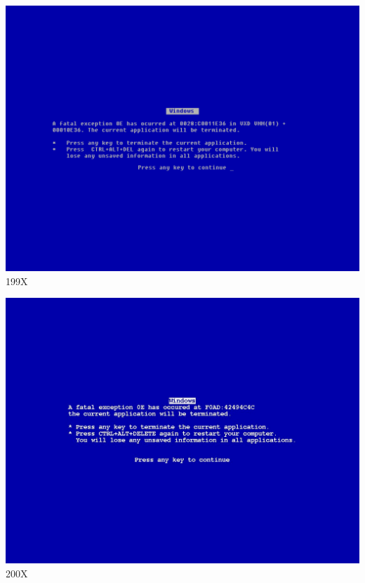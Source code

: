 \documentclass{beamer}
\begin{document}
\begin{frame}
  \begin{center}
    \includegraphics[scale=0.26]{images/Windows_9x_Blue_Screen_of_Death_recreated_in_Fixedsys.png}\\
    199X
  \end{center}
\end{frame}

\begin{frame}
  \begin{center}
    \includegraphics[scale=0.27]{images/fix-bsod-win7.jpg}\\
    200X
  \end{center}
\end{frame}
\end{document}
